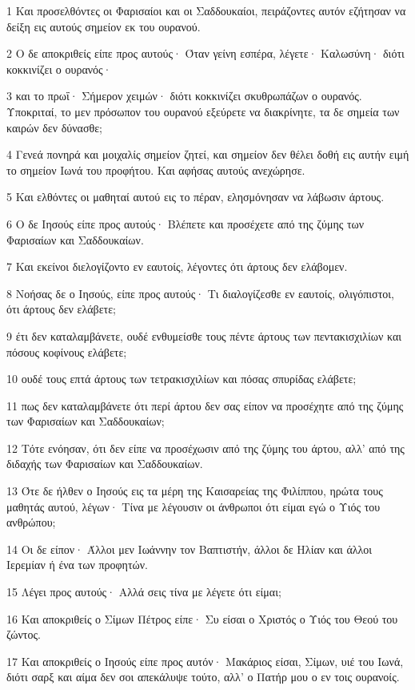 \par 1 Και προσελθόντες οι Φαρισαίοι και οι Σαδδουκαίοι, πειράζοντες αυτόν εζήτησαν να δείξη εις αυτούς σημείον εκ του ουρανού.
\par 2 Ο δε αποκριθείς είπε προς αυτούς· Όταν γείνη εσπέρα, λέγετε· Καλωσύνη· διότι κοκκινίζει ο ουρανός·
\par 3 και το πρωΐ· Σήμερον χειμών· διότι κοκκινίζει σκυθρωπάζων ο ουρανός. Υποκριταί, το μεν πρόσωπον του ουρανού εξεύρετε να διακρίνητε, τα δε σημεία των καιρών δεν δύνασθε;
\par 4 Γενεά πονηρά και μοιχαλίς σημείον ζητεί, και σημείον δεν θέλει δοθή εις αυτήν ειμή το σημείον Ιωνά του προφήτου. Και αφήσας αυτούς ανεχώρησε.
\par 5 Και ελθόντες οι μαθηταί αυτού εις το πέραν, ελησμόνησαν να λάβωσιν άρτους.
\par 6 Ο δε Ιησούς είπε προς αυτούς· Βλέπετε και προσέχετε από της ζύμης των Φαρισαίων και Σαδδουκαίων.
\par 7 Και εκείνοι διελογίζοντο εν εαυτοίς, λέγοντες ότι άρτους δεν ελάβομεν.
\par 8 Νοήσας δε ο Ιησούς, είπε προς αυτούς· Τι διαλογίζεσθε εν εαυτοίς, ολιγόπιστοι, ότι άρτους δεν ελάβετε;
\par 9 έτι δεν καταλαμβάνετε, ουδέ ενθυμείσθε τους πέντε άρτους των πεντακισχιλίων και πόσους κοφίνους ελάβετε;
\par 10 ουδέ τους επτά άρτους των τετρακισχιλίων και πόσας σπυρίδας ελάβετε;
\par 11 πως δεν καταλαμβάνετε ότι περί άρτου δεν σας είπον να προσέχητε από της ζύμης των Φαρισαίων και Σαδδουκαίων;
\par 12 Τότε ενόησαν, ότι δεν είπε να προσέχωσιν από της ζύμης του άρτου, αλλ' από της διδαχής των Φαρισαίων και Σαδδουκαίων.
\par 13 Ότε δε ήλθεν ο Ιησούς εις τα μέρη της Καισαρείας της Φιλίππου, ηρώτα τους μαθητάς αυτού, λέγων· Τίνα με λέγουσιν οι άνθρωποι ότι είμαι εγώ ο Υιός του ανθρώπου;
\par 14 Οι δε είπον· Άλλοι μεν Ιωάννην τον Βαπτιστήν, άλλοι δε Ηλίαν και άλλοι Ιερεμίαν ή ένα των προφητών.
\par 15 Λέγει προς αυτούς· Αλλά σεις τίνα με λέγετε ότι είμαι;
\par 16 Και αποκριθείς ο Σίμων Πέτρος είπε· Συ είσαι ο Χριστός ο Υιός του Θεού του ζώντος.
\par 17 Και αποκριθείς ο Ιησούς είπε προς αυτόν· Μακάριος είσαι, Σίμων, υιέ του Ιωνά, διότι σαρξ και αίμα δεν σοι απεκάλυψε τούτο, αλλ' ο Πατήρ μου ο εν τοις ουρανοίς.

